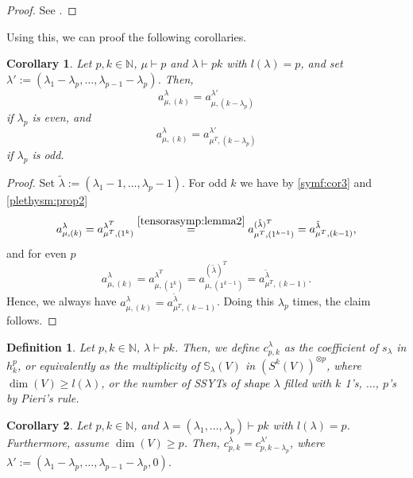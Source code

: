 \documentclass[a4paper]{amsart}
\newtheorem{definition}{Definition}
\newtheorem{corollary}{Corollary}
\def\N{{\mathbb{N}}}
\begin{document}
\begin{proof}
	See \cite[Lemma 3.2]{KM16}.
\end{proof}
Using this, we can proof the following corollaries.
\begin{corollary}\label{plethysm:cor1}
	Let $p,k\in\N$, $\mu\vdash p$ and $\lambda\vdash pk$ with $l(\lambda)=p$, and set $\lambda':=(\lambda_1-\lambda_p,\ldots,\lambda_{p-1}-\lambda_p)$.
	Then,
	\begin{displaymath}
		a_{\mu,(k)}^\lambda=a_{\mu,(k-\lambda_p)}^{\lambda'}
	\end{displaymath}
	if $\lambda_p$ is even,
	and
	\begin{displaymath}
		a_{\mu,(k)}^\lambda=a_{\mu^T,(k-\lambda_p)}^{\lambda'}
	\end{displaymath}
	if $\lambda_p$ is odd.
\end{corollary}
\begin{proof}
	Set $\tilde\lambda:=(\lambda_1-1,\ldots,\lambda_p-1)$.
	For odd $k$ we have by \cref{symf:cor3} and \cref{plethysm:prop2}
	\begin{displaymath}
		a_{\mu,(k)}^\lambda=
		a_{\mu^T,(1^k)}^{\lambda^T}\overset{\cref{tensorasymp:lemma2}}{=}
		a_{\mu^T,(1^{k-1})}^{(\tilde\lambda)^T}=
		a_{\mu^T,(k-1)}^{\tilde\lambda},
	\end{displaymath}
	and for even $p$
	\begin{displaymath}
		a_{\mu,(k)}^\lambda=
		a_{\mu,(1^k)}^{\lambda^T}=
		a_{\mu,(1^{k-1})}^{(\tilde\lambda)^T}=
		a_{\mu^T,(k-1)}^{\tilde\lambda}.
	\end{displaymath}
	Hence, we always have $a_{\mu,(k)}^\lambda=a_{\mu^T,(k-1)}^{\tilde\lambda}$.
	Doing this $\lambda_p$ times, the claim follows.
\end{proof}
\begin{definition}\label{def:c}
	Let $p,k\in\N$, $\lambda\vdash pk$.
	Then, we define $c_{p,k}^\lambda$ as the coefficient of $s_\lambda$ in $h_k^p$,
	or equivalently as the multiplicity of $\mathbb{S}_\lambda(V)$ in $(S^k(V))^{\otimes p}$, where $\dim(V)\geq l(\lambda)$, or the number of SSYTs of shape $\lambda$ filled with $k$ 1's, $\ldots$, $p$'s by Pieri's rule.
\end{definition}
\begin{corollary}\label{tensorasymp:cor1}
	Let $p,k\in\N$, and $\lambda=(\lambda_1,\ldots,\lambda_p)\vdash pk$ with $l(\lambda)=p$.
	Furthermore, assume $\dim(V)\geq p$.
	Then, $c_{p,k}^\lambda=c_{p,k-\lambda_p}^{\lambda'}$, where $\lambda':=(\lambda_1-\lambda_p,\ldots,\lambda_{p-1}-\lambda_p,0)$.
\end{corollary}
\end{document}
